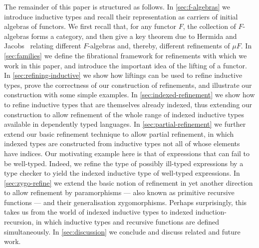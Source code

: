 \documentclass{LMCS}
\begin{document}
The remainder of this paper is structured as follows. In
\autoref{sec:f-algebras} we introduce inductive types and recall their
representation as carriers of initial algebras of functors. We first
recall that, for any functor $F$, the collection of $F$-algebras
forms a category, and then give a key theorem due to Hermida and
Jacobs~\cite{hermida98structural} relating different $F$-algebras and,
thereby, different refinements of $\mu F$. In \autoref{sec:families}
we define the fibrational framework for refinements with which we work
in this paper, and introduce the important idea of the lifting of a
functor. In \autoref{sec:refining-inductive} we show how liftings can
be used to refine inductive types, prove the correctness of our
construction of refinements, and illustrate our construction with some
simple examples.  In \autoref{sec:indexed-refinement} we show how to
refine inductive types that are themselves already indexed, thus
extending our construction to allow refinement of the whole range of
indexed inductive types available in dependently typed languages.  In
\autoref{sec:partial-refinement} we further extend our basic
refinement technique to allow partial refinement, in which indexed
types are constructed from inductive types not all of whose elements
have indices. Our motivating example here is that of expressions that
can fail to be well-typed. Indeed, we refine the type of possibly
ill-typed expressions by a type checker to yield the indexed inductive
type of well-typed expressions. In \autoref{sec:zygo-refine} we extend
the basic notion of refinement in yet another direction to allow
refinement by paramorphisms --- also known as primitive recursive
functions --- and their generalisation zygomorphisms. Perhaps
surprisingly, this takes us from the world of indexed inductive types
to indexed induction-recursion, in which inductive types and recursive
functions are defined simultaneously.  In \autoref{sec:discussion} we
conclude and discuss related and future work.
\end{document}
